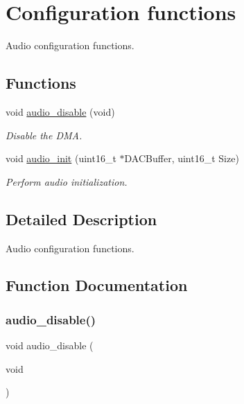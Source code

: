 \hypertarget{group___audio___init}{}\section{Configuration functions}
\label{group___audio___init}


Audio configuration functions.  


\subsection*{Functions}
\begin{DoxyCompactItemize}
\item 
void \hyperlink{group___audio___init_gafff6cd7f4332d078ce0114143cd30998}{audio\+\_\+disable} (void)
\begin{DoxyCompactList}\small\item\em Disable the D\+MA. \end{DoxyCompactList}\item 
void \hyperlink{group___audio___init_gabcda20e7d4baa315d151230fcc81ec1d}{audio\+\_\+init} (uint16\+\_\+t $\ast$D\+A\+C\+Buffer, uint16\+\_\+t Size)
\begin{DoxyCompactList}\small\item\em Perform audio initialization. \end{DoxyCompactList}\end{DoxyCompactItemize}


\subsection{Detailed Description}
Audio configuration functions. 



\subsection{Function Documentation}
\mbox{\label{group___audio___init_gafff6cd7f4332d078ce0114143cd30998}} 
\subsubsection{\texorpdfstring{audio\+\_\+disable()}{audio\_disable()}}
{\footnotesize\ttfamily void audio\+\_\+disable (\begin{DoxyParamCaption}\item[{void}]{ }\end{DoxyParamCaption})}



